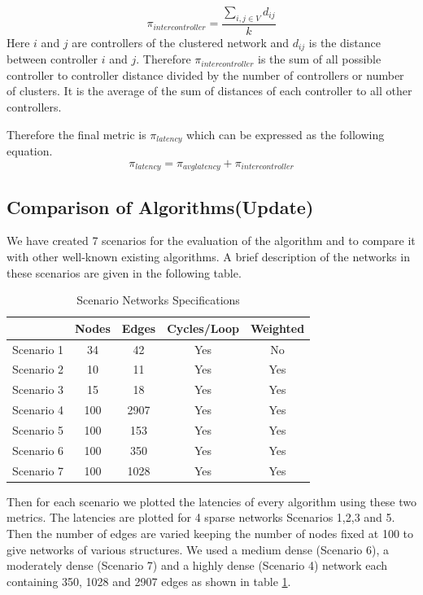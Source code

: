 \documentclass[10pt]{extarticle}
\begin{document}
	\begin{equation}
	\pi_{intercontroller}=\frac{\sum_{i,j\in V}d_{ij}}{k}
	\end{equation}
	Here $i$ and $j$ are controllers of the clustered network and $d_{ij}$ is the distance between controller $i$ and $j$. Therefore $\pi_{intercontroller}$ is the sum of all possible controller to controller distance divided by the number of controllers or number of clusters. It is the average of the sum of distances of each controller to all other controllers.
	
	Therefore the final metric is $\pi_{latency}$ which can be expressed as the following equation.
	\begin{equation}
	\pi_{latency} = \pi_{avglatency} + \pi_{intercontroller}
	\end{equation}
	
	\subsection{Comparison of Algorithms(Update)} \label{comp}
	
	We have created 7 scenarios for the evaluation of the algorithm and to compare it with other well-known existing algorithms. A brief description of the networks in these scenarios are given in the following table.
	\begin{table}
		\begin{center}
			\caption{Scenario Networks Specifications} \label{scenarios}
			\begin{tabular}{|l|c|c|c|c|}
				\hline
				& Nodes & Edges & Cycles/Loop & Weighted \\
				\hline
				Scenario 1 & 34 & 42 & Yes & No\\
				Scenario 2 & 10 & 11 & Yes & Yes\\
				Scenario 3 & 15 & 18 & Yes & Yes\\
				Scenario 4 & 100 & 2907 & Yes & Yes\\
				Scenario 5 & 100 & 153 & Yes & Yes\\
				Scenario 6 & 100 & 350 & Yes & Yes\\
				Scenario 7 & 100 & 1028 & Yes & Yes\\
				\hline
			\end{tabular}
		\end{center}
	\end{table}
			

	Then for each scenario  we plotted the latencies of every algorithm using these two metrics. The latencies are plotted for 4 sparse networks Scenarios 1,2,3 and 5. Then the number of edges are varied keeping the number of nodes fixed at 100 to give networks of various structures. We used a medium dense (Scenario 6), a moderately dense (Scenario 7) and a highly dense (Scenario 4) network each containing 350, 1028 and 2907 edges as shown in table \ref{scenarios}.
	
\end{document}
